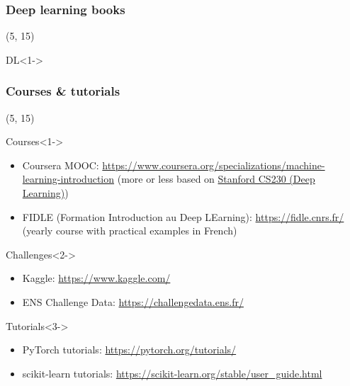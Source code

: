 \begin{frame}
  \frametitle{Deep learning books}

  \nocite{*}

  \begin{textblock}{90}(5, 15)
    \begin{block}{DL}<1->
      \printbibliography[heading=none,category=deep_learning]
    \end{block}
  \end{textblock}
\end{frame}

\begin{frame}
  \frametitle{Courses \& tutorials}

  \begin{textblock}{90}(5, 15)
    \begin{block}{Courses}<1->
      \begin{itemize}
      \item Coursera MOOC:
        \url{https://www.coursera.org/specializations/machine-learning-introduction} (more or less based on \href{https://cs230.stanford.edu/}{Stanford CS230 (Deep Learning)})
      \item FIDLE (Formation Introduction au Deep LEarning): \url{https://fidle.cnrs.fr/}
        (yearly course with practical examples in French)
      \end{itemize}
    \end{block}

    \begin{block}{Challenges}<2->
      \begin{itemize}
      \item Kaggle: \url{https://www.kaggle.com/}
      \item ENS Challenge Data: \url{https://challengedata.ens.fr/}
      \end{itemize}
    \end{block}

    \begin{block}{Tutorials}<3->
      \begin{itemize}
      \item PyTorch tutorials: \url{https://pytorch.org/tutorials/}
      \item scikit-learn tutorials:
        \url{https://scikit-learn.org/stable/user_guide.html}
      \end{itemize}
    \end{block}
  \end{textblock}
\end{frame}
